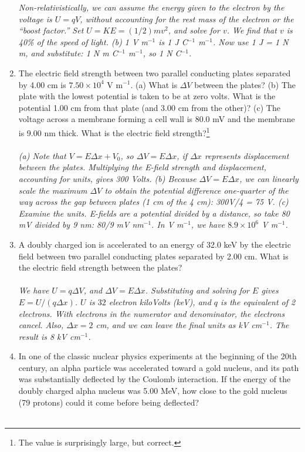 \documentclass[12pt,twocolumn]{article}
\begin{document}
\begin{enumerate}
\textit{Non-relativistically, we can assume the energy given to the electron by the voltage is $U = qV$, without accounting for the rest mass of the electron or the ``boost factor.''  Set $U = KE = (1/2) m v^2$, and solve for $v$.  We find that $v$ is 40\% of the speed of light. (b) 1 V m$^{-1}$ is 1 J C$^{-1}$ m$^{-1}$.  Now use 1 J = 1 N m, and substitute: 1 N m C$^{-1}$ m$^{-1}$, so 1 N C$^{-1}$.}
\item The electric field strength between two parallel conducting plates separated by 4.00 cm is $7.50 \times 10^4$ V m$^{-1}$. (a) What is $\Delta V$ between the plates? (b) The plate with the lowest potential is taken to be at zero volts. What is the potential 1.00 cm from that plate (and 3.00 cm from the other)? (c) The voltage across a membrane forming a cell wall is 80.0 mV and the membrane is 9.00 nm thick. What is the electric field strength?\footnote{The value is surprisingly large, but correct.} \\ \\
\textit{(a) Note that $V = E\Delta x + V_0$, so $\Delta V = E\Delta x$, if $\Delta x$ represents displacement between the plates.  Multiplying the E-field strength and displacement, accounting for units, gives 300 Volts. (b) Because $\Delta V = E\Delta x$, we can linearly scale the maximum $\Delta V$ to obtain the potential difference one-quarter of the way across the gap between plates (1 cm of the 4 cm): 300V/4 = 75 V. (c) Examine the units.  E-fields are a potential divided by a distance, so take 80 mV divided by 9 nm: 80/9 mV nm$^{-1}$.  In V m$^{-1}$, we have $8.9 \times 10^{6}$ V m$^{-1}$.}
\item A doubly charged ion is accelerated to an energy of 32.0 keV by the electric field between two parallel conducting plates separated by 2.00 cm. What is the electric field strength between the plates? \\ \\
\textit{We have $U = q\Delta V$, and $\Delta V = E\Delta x$.  Substituting and solving for $E$ gives $E = U/(q\Delta x)$.  $U$ is $32$ electron kiloVolts (keV), and $q$ is the equivalent of 2 electrons.  With electrons in the numerator and denominator, the electrons cancel.  Also, $\Delta x = 2$ cm, and we can leave the final units as kV cm$^{-1}$. The result is 8 kV cm$^{-1}$.}
\item In one of the classic nuclear physics experiments at the beginning of the 20th century, an alpha particle was accelerated toward a gold nucleus, and its path was substantially deflected by the Coulomb interaction. If the energy of the doubly charged alpha nucleus was 5.00 MeV, how close to the gold nucleus (79 protons) could it come before being deflected? \\ \\

\end{enumerate}
\end{document}
